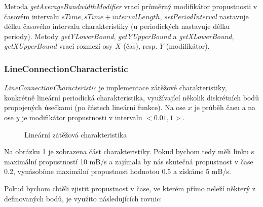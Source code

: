 \documentclass[czech,DP]{thesiskiv}
\begin{document}
\noindent Metoda \textit{getAverageBandwidthModifier} vrací průměrný modifikátor propustnosti v časovém intervalu $sTime, sTime + intervalLength$, \textit{setPeriodInterval} nastavuje délku časového intervalu charakteristiky (u periodických nastavuje délku periody). Metody \textit{getYLowerBound}, \textit{getYUpperBound} a \textit{getXLowerBound}, \textit{getXUpperBound} vrací rozmezí osy $X$ (čas), resp. $Y$ (modifikátor).

\subsubsection*{LineConnectionCharacteristic}

\textit{LineConnectionCharacteristic} je implementace zátěžové charakteristiky, konkrétně lineární periodická charakteristika, využívající několik diskrétních bodů propojených úsečkami (po částech lineární funkce). Na ose $x$ je průběh času a na ose $y$ je modifikátor propustnosti v intervalu $<0.01, 1>$.

\begin{figure}
\centering
\caption{Lineární zátěžová charakteristika}
\label{fig:lin_charakteristika_propoje}
\end{figure}

Na obrázku \ref{fig:lin_charakteristika_propoje} je zobrazena část charakteristiky. Pokud bychom tedy měli linku s maximální propustností 10 mB/s a zajímala by nás skutečná propustnost v čase 0.2, vynásobíme maximální propustnost hodnotou 0.5 a získáme 5 mB/s.

Pokud bychom chtěli zjistit propustnost v čase, ve kterém přímo neleží některý z definovaných bodů, je využito následujících rovnic: 
\end{document}
